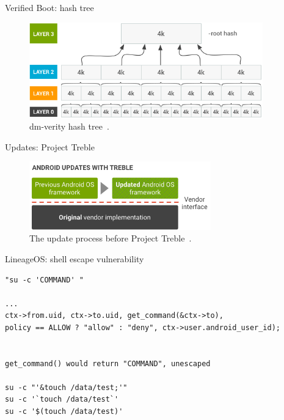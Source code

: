 \documentclass[
    11pt,%
    aspectratio=169,%
]{beamer}
\begin{document}
\begin{frame}{Verified Boot: hash tree}
\begin{figure}[t]
	\centering
	\includegraphics[width=0.9\textwidth]{img/dm-verity-hash-table}
	\caption{dm-verity hash tree~\cite{android_verified_boot}.}
	\label{fig:dm-verity-hash-table}
\end{figure}
\end{frame}




\begin{frame}{Updates: Project Treble }
\begin{figure}[H]
	\centering
	\includegraphics[width=0.7\textwidth]{img/treble_after.png}
	\caption{The update process before Project Treble~\cite{android_treble}.}
	\label{fig:project_treble}
\end{figure}
\end{frame}



\begin{frame}[fragile]{LineageOS: shell escape vulnerability}
\begin{verbatim}
"su -c 'COMMAND' "

...
ctx->from.uid, ctx->to.uid, get_command(&ctx->to),
policy == ALLOW ? "allow" : "deny", ctx->user.android_user_id);


get_command() would return "COMMAND", unescaped

su -c "'&touch /data/test;'"
su -c '`touch /data/test`'
su -c '$(touch /data/test)'
\end{verbatim}
\end{frame}
\end{document}
